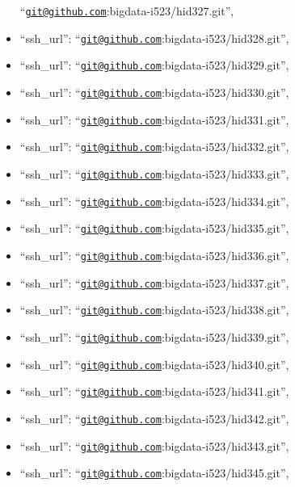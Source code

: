 \begin{itemize}
  ``\href{mailto:git@github.com}{\nolinkurl{git@github.com}}:bigdata-i523/hid327.git'',
\item
  ``ssh\_url'':
  ``\href{mailto:git@github.com}{\nolinkurl{git@github.com}}:bigdata-i523/hid328.git'',
\item
  ``ssh\_url'':
  ``\href{mailto:git@github.com}{\nolinkurl{git@github.com}}:bigdata-i523/hid329.git'',
\item
  ``ssh\_url'':
  ``\href{mailto:git@github.com}{\nolinkurl{git@github.com}}:bigdata-i523/hid330.git'',
\item
  ``ssh\_url'':
  ``\href{mailto:git@github.com}{\nolinkurl{git@github.com}}:bigdata-i523/hid331.git'',
\item
  ``ssh\_url'':
  ``\href{mailto:git@github.com}{\nolinkurl{git@github.com}}:bigdata-i523/hid332.git'',
\item
  ``ssh\_url'':
  ``\href{mailto:git@github.com}{\nolinkurl{git@github.com}}:bigdata-i523/hid333.git'',
\item
  ``ssh\_url'':
  ``\href{mailto:git@github.com}{\nolinkurl{git@github.com}}:bigdata-i523/hid334.git'',
\item
  ``ssh\_url'':
  ``\href{mailto:git@github.com}{\nolinkurl{git@github.com}}:bigdata-i523/hid335.git'',
\item
  ``ssh\_url'':
  ``\href{mailto:git@github.com}{\nolinkurl{git@github.com}}:bigdata-i523/hid336.git'',
\item
  ``ssh\_url'':
  ``\href{mailto:git@github.com}{\nolinkurl{git@github.com}}:bigdata-i523/hid337.git'',
\item
  ``ssh\_url'':
  ``\href{mailto:git@github.com}{\nolinkurl{git@github.com}}:bigdata-i523/hid338.git'',
\item
  ``ssh\_url'':
  ``\href{mailto:git@github.com}{\nolinkurl{git@github.com}}:bigdata-i523/hid339.git'',
\item
  ``ssh\_url'':
  ``\href{mailto:git@github.com}{\nolinkurl{git@github.com}}:bigdata-i523/hid340.git'',
\item
  ``ssh\_url'':
  ``\href{mailto:git@github.com}{\nolinkurl{git@github.com}}:bigdata-i523/hid341.git'',
\item
  ``ssh\_url'':
  ``\href{mailto:git@github.com}{\nolinkurl{git@github.com}}:bigdata-i523/hid342.git'',
\item
  ``ssh\_url'':
  ``\href{mailto:git@github.com}{\nolinkurl{git@github.com}}:bigdata-i523/hid343.git'',
\item
  ``ssh\_url'':
  ``\href{mailto:git@github.com}{\nolinkurl{git@github.com}}:bigdata-i523/hid345.git'',

\end{itemize}
